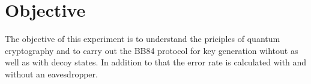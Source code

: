 \section{Objective}
The objective of this experiment is to understand the priciples of quantum cryptography and to carry out the BB84 protocol for key generation wihtout as well as with decoy states. 
In addition to that the error rate is calculated with and without an eavesdropper.
